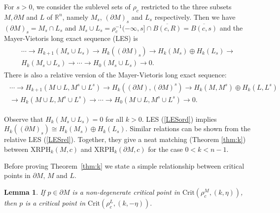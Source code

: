 \documentclass[a4paper,11pt]{article}
\newtheorem{lemma}[theorem]{Lemma}
\theoremstyle{definition}
\newcommand{\R}{\mathbb{R}}
\begin{document}
For $s>0$, we consider the sublevel sets of $\rho_c$ restricted to the three subsets $M,\partial M$ and $L$ of $\R^n$, namely $M_s$, $(\partial M)_s$ and $L_s$ respectively. Then we have $(\partial M)_s=M_s\cap L_s$ and $M_s\cup L_s = \rho_c^{-1}(-\infty, s]\cap \overline{B(c,R)}=\overline{B(c,s)}$ and the Mayer-Vietoris long exact sequence (LES) is
\begin{align}\label{LESord}
\begin{split}
    \cdots\overset{}{\longrightarrow}H_{k+1}(M_s\cup L_s)\longrightarrow H_k((\partial M)_s)\overset{}{\longrightarrow} H_k(M_s)\oplus H_k(L_s)\overset{}{\longrightarrow} \\
   H_k(M_s\cup L_s)\overset{}{\longrightarrow}
    \cdots\longrightarrow H_0(M_s\cup L_s)\longrightarrow 0.
\end{split}
\end{align}
There is also a relative version of the Mayer-Vietoris long exact sequence: 
\begin{align}\label{LESrel}
\begin{split}
    \cdots\overset{}{\longrightarrow}H_{k+1}(M\cup L, M^s\cup L^s)\longrightarrow H_k((\partial M), (\partial M)^s)\overset{}{\longrightarrow} H_k(M,M^s)\oplus H_k(L,L^s)\\ \overset{}{\longrightarrow}
   H_k(M\cup L, M^s\cup L^s)\overset{}{\longrightarrow}
    \cdots\longrightarrow H_0(M\cup L, M^s\cup L^s)\longrightarrow 0.
\end{split} \end{align} 

Observe that $H_k(M_s\cup L_s) = 0$ for all $k>0$. LES (\ref{LESord}) implies $H_k((\partial M)_s)\cong H_k(M_s)\oplus H_k(L_s)$. Similar relations can be shown from the relative LES (\ref{LESrel}). Together, they give a neat matching (Theorem \ref{thm:k}) between $\mathrm{XRPH}_k(M,c)$ and $\mathrm{XRPH}_k(\partial M,c)$ for the case $0<k<n-1$.

Before proving Theorem~\ref{thm:k} we state a simple relationship between critical points in $\partial M$, $M$ and $L$. 
\begin{lemma}\label{lem:swaps}
    If $p\in \partial M$ is a non-degenerate critical point in $\mathrm{Crit}(\rho_c^M,(k,\eta))$, then $p$ is a critical point in $\mathrm{Crit}(\rho_c^L,(k,-\eta)).$
\end{lemma}
\end{document}
